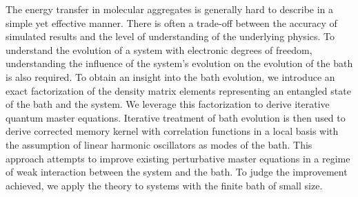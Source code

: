 \documentclass[12pt]{report}
\begin{document}

The energy transfer in molecular aggregates is generally hard to describe in a simple yet effective manner. There is often a trade-off between the accuracy of simulated results and the level of understanding of the underlying physics. To understand the evolution of a system with electronic degrees of freedom, understanding the influence of the system's evolution on the evolution of the bath is also required. To obtain an insight into the bath evolution, we introduce an exact factorization of the density matrix elements representing an entangled state of the bath and the system. We leverage this factorization to derive iterative quantum master equations. Iterative treatment of bath evolution is then used to derive corrected memory kernel with correlation functions in a local basis with the assumption of linear harmonic oscillators as modes of the bath. This approach attempts to improve existing perturbative master equations in a regime of weak interaction between the system and the bath. To judge the improvement achieved, we apply the theory to systems with the finite bath of small size.
\end{document}
